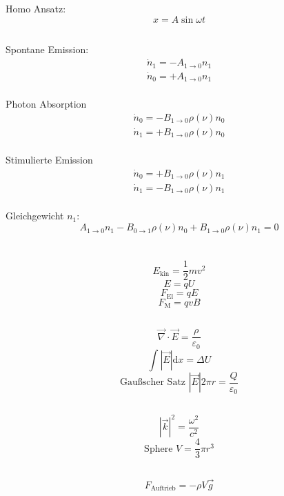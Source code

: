 \documentclass[12pt]{report}
\newcommand{\vabla}{\vec{\nabla}}
\newcommand{\vepsilon}{\varepsilon}
\newcommand{\dd}{\mathrm{d}}
\begin{document}
\subsection{}
Homo Ansatz: \[x=A\sin\omega t\]

\subsection{}
Spontane Emission: \begin{align*}\dot{n}_1=-A_{1\to0}n_1\\\dot{n}_0=+A_{1\to0}n_1\end{align*}\\
Photon Absorption\begin{align*}\dot{n}_0=-B_{1\to0}\rho(\nu)n_0\\\dot{n}_1=+B_{1\to0}\rho(\nu)n_0\end{align*}\\
Stimulierte Emission\begin{align*}\dot{n}_0=+B_{1\to0}\rho(\nu)n_1\\\dot{n}_1=-B_{1\to0}\rho(\nu)n_1\end{align*}\\
Gleichgewicht $n_1$:
\[A_{1\to0}n_1-B_{0\to1}\rho(\nu)n_0+B_{1\to0}\rho(\nu)n_1=0\]

\section{}

\subsection{}
\[E_\mathrm{kin}=\frac{1}{2}mv^2\]
\[E=qU\]
\[F_\mathrm{El}=qE\]
\[F_\mathrm{M}=qvB\]

\subsection{}
\[\vabla\cdot\vec{E}=\frac{\rho}{\vepsilon_0}\]
\[\int|\vec{E}|\dd x=\Delta U\]
\[\textrm{Gau\ss scher Satz }|\vec{E}|2\pi r=\frac{Q}{\vepsilon_0}\]

\subsection{}
\[|\vec{k}|^2=\frac{\omega^2}{c^2}\]
\[\textrm{Sphere }V=\frac{4}{3}\pi r^3\]

\subsection{} 
\[F_\mathrm{Auftrieb}=-\rho V\vec{g}\]
\end{document}
